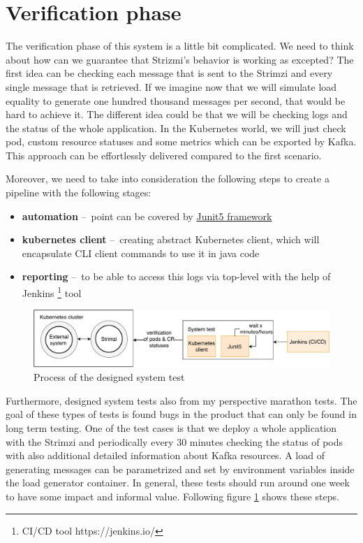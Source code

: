 \documentclass{ExcelAtFIT}
\begin{document}
\section{Verification phase}

The verification phase of this system is a little bit complicated. We need to think about how can we guarantee that Strizmi's behavior is working as excepted? The first idea can be checking each message that is sent to the Strimzi and every single message that is retrieved. If we imagine now that we will simulate load equality to generate one hundred thousand messages per second, that would be hard to achieve it. The different idea could be that we will be checking logs and the status of the whole application. In the Kubernetes world, we will just check pod, custom resource statuses and some metrics which can be exported by Kafka. This approach can be effortlessly delivered compared to the first scenario.

Moreover, we need to take into consideration the following steps to create a pipeline with the following stages:
\begin{itemize}
	\item \textbf{automation} \---\ point can be covered by \href{https://junit.org/junit5/}{Junit5 framework}
	\item \textbf{kubernetes client} \---\ creating abstract Kubernetes client, which will encapsulate CLI client commands to use it in java code
	\item \textbf{reporting} \---\ to be able to access this logs via top-level with the help of Jenkins \footnote{CI/CD tool https://jenkins.io/}  tool
\end{itemize}

\begin{figure}[h!t]
	\centering
	\includegraphics[width=0.9\linewidth]{images/04-verifcationPhase/VerificationBigBig.pdf}
	\caption{Process of the designed system test}
	\label{fig:verification:test}
\end{figure}

Furthermore, designed system tests also from my perspective marathon tests. The goal of these types of tests is found bugs in the product that can only be found in long term testing.  One of the test cases is that we deploy a whole application with the Strimzi and periodically every 30 minutes checking the status of pods with also additional detailed information about Kafka resources.  A load of generating messages can be parametrized and set by environment variables inside the load generator container.  In general, these tests should run around one week to have some impact and informal value. Following figure \ref{fig:verification:test} shows these steps.
\end{document}
